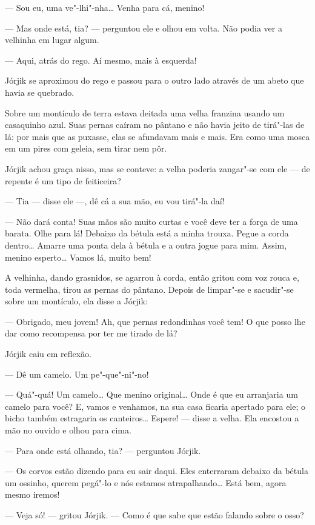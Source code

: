 --- Sou eu, uma ve"-lhi"-nha\ldots{} Venha para cá, menino!

--- Mas onde está, tia? --- perguntou ele e olhou em volta. Não podia
ver a velhinha em lugar algum.

--- Aqui, atrás do rego. Aí mesmo, mais à esquerda!

Jórjik se aproximou do rego e passou para o outro lado através de um
abeto que havia se quebrado.

Sobre um montículo de terra estava deitada uma velha franzina usando um
casaquinho azul. Suas pernas caíram no pântano e não havia jeito de
tirá"-las de lá: por mais que as puxasse, elas se afundavam mais e mais.
Era como uma mosca em um pires com geleia, sem tirar nem pôr.

Jórjik achou graça nisso, mas se conteve: a velha poderia zangar"-se com
ele --- de repente é um tipo de feiticeira?

--- Tia --- disse ele ---, dê cá a sua mão, eu vou tirá"-la daí!

--- Não dará conta! Suas mãos são muito curtas e você deve ter a força
de uma barata. Olhe para lá! Debaixo da bétula está a minha trouxa.
Pegue a corda dentro\ldots{} Amarre uma ponta dela à bétula e a outra jogue
para mim. Assim, menino esperto\ldots{} Vamos lá, muito bem!

A velhinha, dando grasnidos, se agarrou à corda, então gritou com voz
rouca e, toda vermelha, tirou as pernas do pântano. Depois de limpar"-se
e sacudir"-se sobre um montículo, ela disse a Jórjik:

--- Obrigado, meu jovem! Ah, que pernas redondinhas você tem! O que
posso lhe dar como recompensa por ter me tirado de lá?

Jórjik caiu em reflexão.

--- Dê um camelo. Um pe"-que"-ni"-no!

--- Quá"-quá! Um camelo\ldots{} Que menino original\ldots{} Onde é que eu
arranjaria um camelo para você? E, vamos e venhamos, na sua casa ficaria
apertado para ele; o bicho também estragaria os canteiros\ldots{} Espere! ---
disse a velha. Ela encostou a mão no ouvido e olhou para cima.

--- Para onde está olhando, tia? --- perguntou Jórjik.

--- Os corvos estão dizendo para eu sair daqui. Eles enterraram debaixo
da bétula um ossinho, querem pegá"-lo e nós estamos atrapalhando\ldots{} Está
bem, agora mesmo iremos!

--- Veja só! --- gritou Jórjik. --- Como é que sabe que estão falando
sobre o osso?

